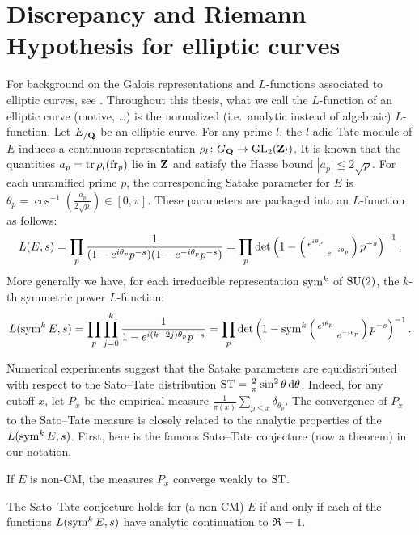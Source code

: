 \section{Discrepancy and Riemann Hypothesis for elliptic curves}

For background on the Galois representations and $L$-functions associated to 
elliptic curves, see \cite[III\S7, C\S17]{silverman-2009}. Throughout this 
thesis, what we call the $L$-function of an elliptic curve (motive, \ldots) is 
the normalized (i.e.~analytic instead of algebraic) $L$-function. 
Let $E_{/\mathbf{Q}}$ be an elliptic curve. For any prime $l$, the $l$-adic Tate 
module of $E$ induces a continuous representation 
$\rho_l \colon G_{\mathbf{Q}} \to \operatorname{GL}_2(\mathbf{Z}_l)$. It is known that the quantities 
$a_p = \operatorname{tr} \rho_l(\mathrm{fr}_p)$ lie in $\mathbf{Z}$ and satisfy the Hasse bound 
$|a_p| \leqslant 2\sqrt p$. For each unramified prime $p$, the 
corresponding Satake parameter for $E$ is 
$\theta_p = \cos^{-1}\left(\frac{a_p}{2\sqrt p}\right) \in [0,\pi]$. 
These parameters are packaged into an $L$-function as follows:
\[
	L(E,s) = \prod_p \frac{1}{(1 - e^{i \theta_p} p^{-s})(1- e^{-i \theta_p} p^{-s})} = \prod_p \det\left(1 - \left(\begin{smallmatrix} e^{i\theta_p} &  \\  & e^{-i \theta_p} \end{smallmatrix}\right)p^{-s}\right)^{-1}.
\]
More generally we have, for each irreducible representation $\operatorname{sym}^k$ of 
$\operatorname{SU}(2)$, the $k$-th symmetric power $L$-function: 
\[
	L(\operatorname{sym}^k E, s) = \prod_p \prod_{j=0}^k \frac{1}{1 - e^{i (k - 2j) \theta_p} p^{-s}} = \prod_p \det\left(1-\operatorname{sym}^k \left(\begin{smallmatrix} e^{i\theta_p} &  \\  & e^{-i \theta_p} \end{smallmatrix}\right)p^{-s}\right)^{-1}.
\]

Numerical experiments suggest that the Satake parameters are equidistributed 
with respect to the Sato--Tate distribution 
$\mathrm{ST} = \frac{2}{\pi} \sin^2\theta\, \mathrm{d}\theta$. Indeed, for any cutoff $x$, let 
$P_x$ be the empirical measure 
$\frac{1}{\pi(x)} \sum_{p\leqslant x} \delta_{\theta_p}$. 
The convergence of $P_x$ to the Sato--Tate measure is closely related to 
the analytic properties of the $L(\operatorname{sym}^k E,s)$. First, here is the famous 
Sato--Tate conjecture (now a theorem) in our notation. 

\begin{theorem}[Taylor et.~al.]
If $E$ is non-CM, the measures $P_x$ converge weakly to $\mathrm{ST}$. 
\end{theorem}

\begin{theorem}[Serre]
The Sato--Tate conjecture holds for (a non-CM) $E$ if and only if each of 
the functions $L(\operatorname{sym}^k E,s)$ have analytic continuation to $\Re = 1$. 
\end{theorem}

